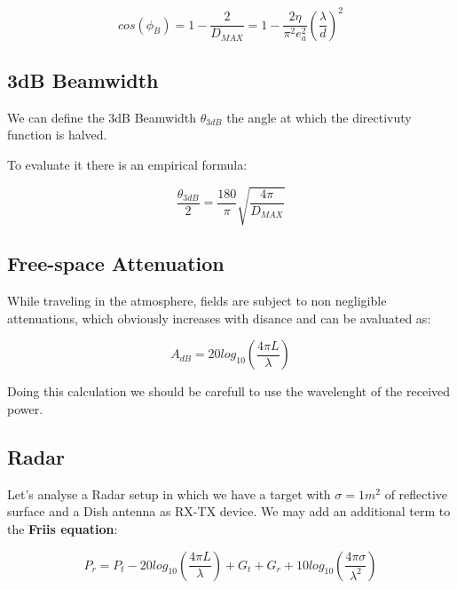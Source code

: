 \begin{equation}
	cos(\phi_B)=  1- \frac{2}{D_{MAX}}=  1 - \frac {2\eta} {\pi^2 e_a^2} \left( \frac{\lambda}{d} \right)^2
\end{equation}


\subsection{3dB Beamwidth} %
\label{sub:3db_beamwidth}

We can define the 3dB Beamwidth $\theta_{3dB}$ the angle at which the directivuty function is halved.

To evaluate it there is an empirical formula:

\begin{equation}
	\frac{\theta_{3dB}}{2}= \frac{180}{\pi}\sqrt{\frac{4\pi}{D_{MAX}}}
\end{equation}




\subsection{Free-space Attenuation} %
\label{sub:free_space_attenuation}

While traveling in the atmosphere, fields are subject to non negligible attenuations, which obviously increases with disance and can be avaluated as:

\begin{equation}
	A_{dB} = 20log_{10} \left( \frac{4 \pi L}{\lambda} \right)
\end{equation}

Doing this calculation we should be carefull to use the wavelenght of the received power.

\subsection{Radar} %
\label{sub:radar}

Let's analyse a Radar setup in which we have a target with $\sigma = 1m^2$ of reflective surface and a Dish antenna as RX-TX device.
We may add an additional term to the \textbf{Friis equation}:

\begin{equation}
	P_r= P_t - 20log_{10}\left( \frac{4\pi L}{\lambda}\right)+ G_t +G_r + 10log_{10}\left( \frac{4 \pi \sigma}{\lambda^2}\right)
\end{equation}

